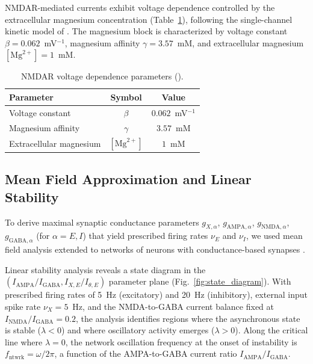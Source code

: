 \documentclass[10pt]{article}
\begin{document}
NMDAR-mediated currents exhibit voltage dependence controlled by the
extracellular magnesium concentration (Table~\ref{tab:nmdar_params}), following
the single-channel kinetic model of \citet{jahr1990voltage}. The magnesium
block is characterized by voltage constant $\beta = 0.062$~mV$^{-1}$,
magnesium affinity $\gamma = 3.57$~mM, and extracellular magnesium
$[\text{Mg}^{2+}] = 1$~mM.

\begin{table}[htbp]
\centering
\caption{NMDAR voltage dependence parameters (\citet{jahr1990voltage}).}
\label{tab:nmdar_params}
\begin{tabular}{lcc}
\toprule
Parameter & Symbol & Value \\
\midrule
Voltage constant & $\beta$ & $0.062$~mV$^{-1}$ \\
Magnesium affinity & $\gamma$ & $3.57$~mM \\
Extracellular magnesium & $[\text{Mg}^{2+}]$ & $1$~mM \\
\bottomrule
\end{tabular}
\end{table}

\subsection{Mean Field Approximation and Linear Stability}

To derive maximal synaptic conductance parameters $g_{X,\alpha}$,
$g_{\text{AMPA},\alpha}$, $g_{\text{NMDA},\alpha}$, $g_{\text{GABA},\alpha}$
(for $\alpha = E, I$) that yield prescribed firing rates $\nu_E$ and $\nu_I$,
we used mean field analysis \citep{amit1997model, brunel2000dynamics} extended
to networks of neurons with conductance-based synapses
\citep{brunel2001effects}.

Linear stability analysis reveals a state diagram in the
$(I_{\text{AMPA}}/I_{\text{GABA}}, I_{X,E}/I_{\theta,E})$ parameter plane
(Fig.~\ref{fig:state_diagram}). With prescribed firing rates of 5~Hz
(excitatory) and 20~Hz (inhibitory), external input spike rate
$\nu_X = 5$~Hz, and the NMDA-to-GABA current balance fixed at
$I_{\text{NMDA}}/I_{\text{GABA}} = 0.2$, the analysis identifies regions
where the asynchronous state is stable ($\lambda < 0$) and where oscillatory
activity emerges ($\lambda > 0$). Along the critical line where $\lambda = 0$,
the network oscillation frequency at the onset of instability is
$f_{\text{ntwrk}} = \omega / 2\pi$, a function of the AMPA-to-GABA current
ratio $I_{\text{AMPA}}/I_{\text{GABA}}$.
\end{document}
